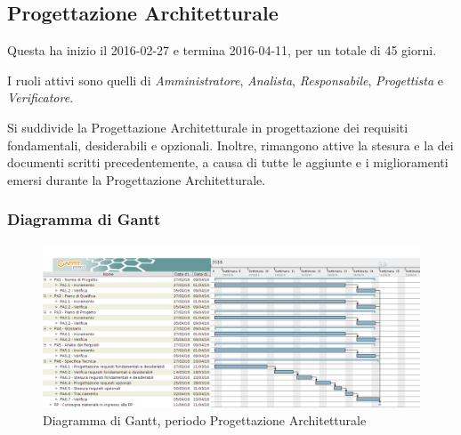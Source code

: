 \subsection{Progettazione Architetturale}
Questa  ha inizio il 2016-02-27 e termina 2016-04-11, per un totale di 45 giorni.

I ruoli attivi sono quelli di \textit{Amministratore}, \textit{Analista}, \textit{Responsabile}, \textit{Progettista} e \textit{Verificatore}.

Si suddivide la Progettazione Architetturale in progettazione dei requisiti fondamentali, desiderabili e opzionali. Inoltre, rimangono attive la stesura e la  dei documenti scritti precedentemente, a causa di tutte le aggiunte e i miglioramenti emersi durante la Progettazione Architetturale.

\subsubsection{Diagramma di Gantt}
\begin{figure}[ht!]
  \includegraphics[width=1\textwidth]{res/img/pianificazione/ProgettazioneArchitetturale}
  \caption{Diagramma di Gantt, periodo Progettazione Architetturale}
\end{figure}

